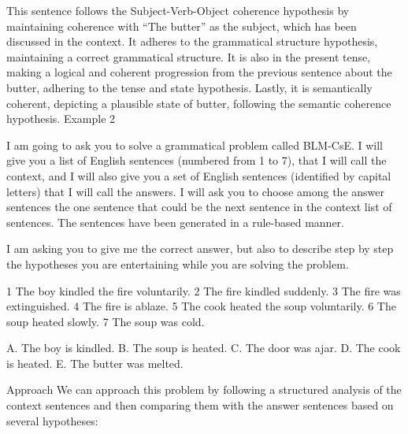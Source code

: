 This sentence follows the Subject-Verb-Object coherence hypothesis by maintaining coherence with “The butter” as the subject, which has been discussed in the context. It adheres to the grammatical structure hypothesis, maintaining a correct grammatical structure. It is also in the present tense, making a logical and coherent progression from the previous sentence about the butter, adhering to the tense and state hypothesis. Lastly, it is semantically coherent, depicting a plausible state of butter, following the semantic coherence hypothesis.
Example 2 

I am going to ask you to solve a grammatical problem called BLM-CsE.  I will give you a list of English sentences (numbered from 1 to 7), that I will call the context, and I will also give you a set of English sentences (identified by capital letters) that I will call  the answers. I will ask you to choose among the answer sentences the one sentence that could be the next sentence in the context list of sentences. The sentences have been generated in a rule-based manner. 

I am asking you to give me the correct answer, but also to describe step by step  the hypotheses you are entertaining while you are solving the problem. 



1 The boy kindled the fire voluntarily.
2 The fire kindled suddenly.
3 The fire was extinguished.
4 The fire is ablaze.
5 The cook heated the soup voluntarily.
6 The soup heated slowly.
7 The soup was cold.

A. The boy is kindled.
B. The soup is heated.
C. The door was ajar.
D. The cook is heated.
E. The butter was melted.


Approach
We can approach this problem by following a structured analysis of the context sentences and then comparing them with the answer sentences based on several hypotheses:

